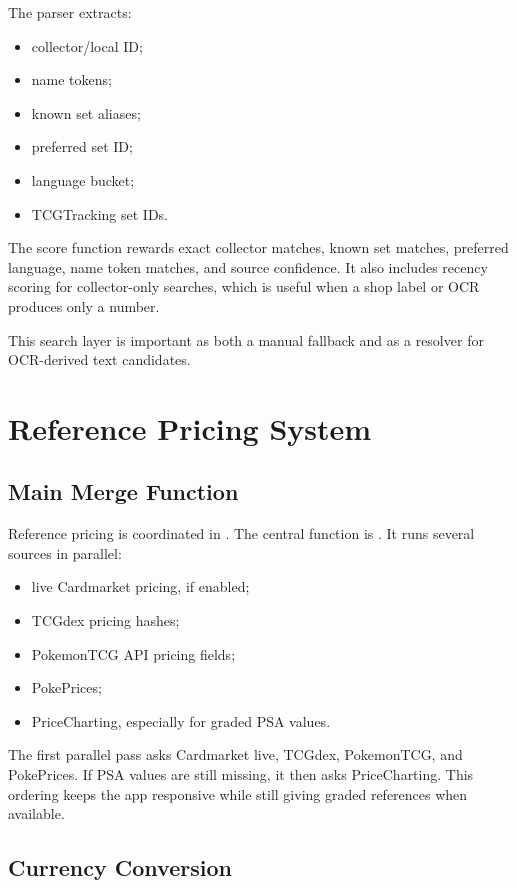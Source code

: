 \documentclass[11pt,a4paper]{article}
\begin{document}
The parser extracts:

\begin{itemize}
  \item collector/local ID;
  \item name tokens;
  \item known set aliases;
  \item preferred set ID;
  \item language bucket;
  \item TCGTracking set IDs.
\end{itemize}

The score function rewards exact collector matches, known set matches, preferred language, name token matches, and source confidence. It also includes recency scoring for collector-only searches, which is useful when a shop label or OCR produces only a number.

This search layer is important as both a manual fallback and as a resolver for OCR-derived text candidates.

\section{Reference Pricing System}

\subsection{Main Merge Function}

Reference pricing is coordinated in . The central function is . It runs several sources in parallel:

\begin{itemize}
  \item live Cardmarket pricing, if enabled;
  \item TCGdex pricing hashes;
  \item PokemonTCG API pricing fields;
  \item PokePrices;
  \item PriceCharting, especially for graded PSA values.
\end{itemize}

The first parallel pass asks Cardmarket live, TCGdex, PokemonTCG, and PokePrices. If PSA values are still missing, it then asks PriceCharting. This ordering keeps the app responsive while still giving graded references when available.

\subsection{Currency Conversion}
\end{document}
